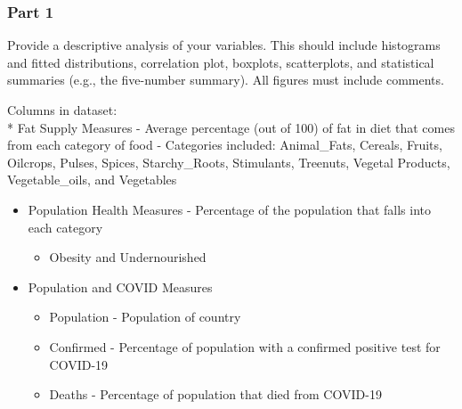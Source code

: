 \documentclass[
]{article}
\providecommand{\tightlist}{%
  \setlength{\itemsep}{0pt}\setlength{\parskip}{0pt}}
\begin{document}
\hypertarget{part-1}{%
\subsubsection{Part 1}\label{part-1}}

Provide a descriptive analysis of your variables. This should include
histograms and fitted distributions, correlation plot, boxplots,
scatterplots, and statistical summaries (e.g., the five-number summary).
All figures must include comments.

Columns in dataset:\\
* Fat Supply Measures - Average percentage (out of 100) of fat in diet
that comes from each category of food - Categories included:
Animal\_Fats, Cereals, Fruits, Oilcrops, Pulses, Spices, Starchy\_Roots,
Stimulants, Treenuts, Vegetal Products, Vegetable\_oils, and Vegetables

\begin{itemize}
\tightlist
\item
  Population Health Measures - Percentage of the population that falls
  into each category

  \begin{itemize}
  \tightlist
  \item
    Obesity and Undernourished
  \end{itemize}
\item
  Population and COVID Measures

  \begin{itemize}
  \tightlist
  \item
    Population - Population of country
  \item
    Confirmed - Percentage of population with a confirmed positive test
    for COVID-19
  \item
    Deaths - Percentage of population that died from COVID-19
  \end{itemize}
\end{itemize}
\end{document}
